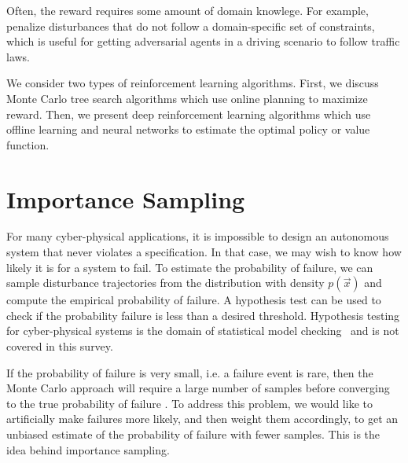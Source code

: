 Often, the reward requires some amount of domain knowlege. For example, \textcite{qin2019automatic} penalize disturbances that do not follow a domain-specific set of constraints, which is useful for getting adversarial agents in a driving scenario to follow traffic laws. 

We consider two types of reinforcement learning algorithms. First, we discuss Monte Carlo tree search algorithms which use online planning to maximize reward. Then, we present deep reinforcement learning algorithms which use offline learning and neural networks to estimate the optimal policy or value function.

\section{Importance Sampling}
For many cyber-physical applications, it is impossible to design an autonomous system that never violates a specification. In that case, we may wish to know how likely it is for a system to fail. To estimate the probability of failure, we can sample disturbance trajectories from the distribution with density $p(\vec{x})$ and compute the empirical probability of failure. A hypothesis test can be used to check if the probability failure is less than a desired threshold. Hypothesis testing for cyber-physical systems is the domain of statistical model checking~\cite{legay2010statistical,agha2018survey} and is not covered in this survey. 

If the probability of failure is very small, i.e. a failure event is rare, then the Monte Carlo approach will require a large number of samples before converging to the true probability of failure \cite{hahn1972sample}. To address this problem, we would like to artificially make failures more likely, and then weight them accordingly, to get an unbiased estimate of the probability of failure with fewer samples. This is the idea behind importance sampling.

